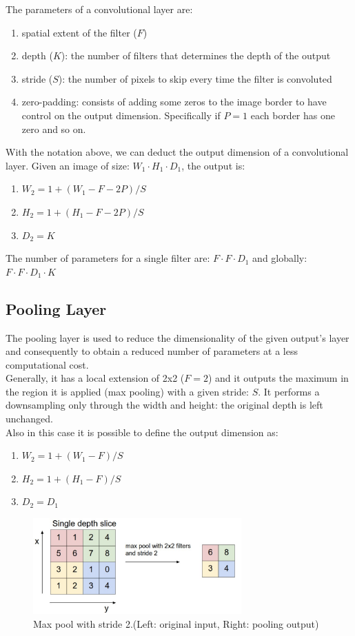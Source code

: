 \documentclass[LaM,binding=0.6cm]{sapthesis}
\begin{document}
The parameters of a convolutional layer are:
\begin{enumerate}
\item spatial extent of the filter ($F$)
\item depth ($K$): the number of filters that determines the depth of the output
\item stride ($S$): the number of pixels to skip every time the filter is convoluted
\item zero-padding: consists of adding some zeros to the image border to have control on the output dimension. Specifically if $P=1$ each border has one zero and so on.
\end{enumerate}
With the notation above, we can deduct the output dimension of a convolutional layer. Given an image of size: $W_1 \cdot H_1 \cdot D_1$, the output is:
\begin{enumerate}
\item $W_2 = 1+(W_1-F-2P)/S$
\item $H_2 = 1+(H_1-F-2P)/S$
\item $D_2 = K$
\end{enumerate} 
The number of parameters for a single filter are: $F\cdot F\cdot D_1$ and globally: $F\cdot F\cdot D_1\cdot K$
\subsection{Pooling Layer}
The pooling layer is used to reduce the dimensionality of the given output's layer and consequently to obtain a reduced number of parameters at a less computational cost.\\Generally, it has a local extension of 2x2 ($F=2$) and it outputs the maximum in the region it is applied (max pooling) with a given stride: $S$. It performs a downsampling only through the width and height: the original depth is left unchanged.\\Also in this case it is possible to define the output dimension as:
\begin{enumerate}
\item $W_2 = 1+(W_1-F)/S$
\item $H_2 = 1+(H_1-F)/S$
\item $D_2 = D_1$
\end{enumerate} 
\begin{figure}[H]  \centering
	\includegraphics[width=80mm,scale=0.7]{pool}
	\caption{Max pool with stride 2.(Left: original input, Right: pooling output) \cite{cnnsite}}
	\label{fig:pool}
\end{figure}
\end{document}
